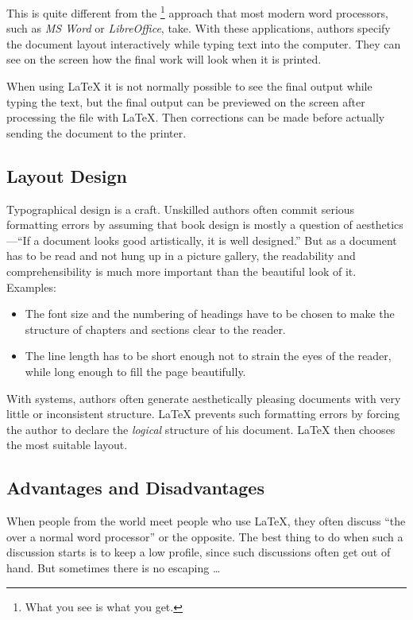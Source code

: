 This is quite different from the \footnote{What you see is
  what you get.} approach that most modern word processors, such as
\emph{MS Word} or \emph{LibreOffice}, take. With these
applications, authors specify the document layout interactively while
typing text into the computer. They can see on the
screen how the final work will look when it is printed.

When using \LaTeX{} it is not normally possible to see the final output
while typing the text, but the final output can be previewed on the
screen after processing the file with \LaTeX. Then corrections can be
made before actually sending the document to the printer.

\subsection{Layout Design}\label{sec:layout_design}

Typographical design is a craft. Unskilled authors often commit
serious formatting errors by assuming that book design is mostly a
question of aesthetics---``If a document looks good artistically,
it is well designed.'' But as a document has to be read and not hung
up in a picture gallery, the readability and comprehensibility is
much more important than the beautiful look of it.
Examples:
\begin{itemize}
  \item The font size and the numbering of headings have to be chosen to make
        the structure of chapters and sections clear to the reader.
  \item The line length has to be short enough not to strain
        the eyes of the reader, while long enough to fill the page
        beautifully.
\end{itemize}

With  systems, authors often generate aesthetically
pleasing documents with very little or inconsistent structure.
\LaTeX{} prevents such formatting errors by forcing the author to
declare the \emph{logical} structure of his document. \LaTeX{} then
chooses the most suitable layout.

\subsection{Advantages and Disadvantages}

When people from the  world meet people who use \LaTeX{},
they often discuss ``the  over a normal
word processor'' or the opposite.  The best thing to do when such
a discussion starts is to keep a low profile, since such discussions
often get out of hand. But sometimes there is no escaping \ldots

